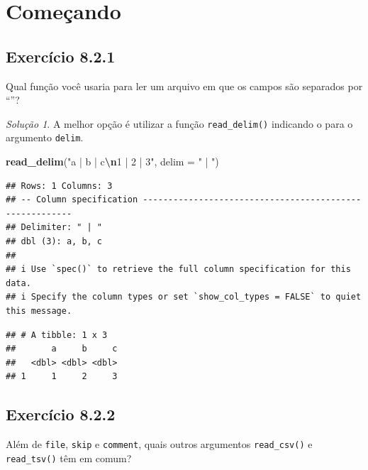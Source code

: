 \documentclass[
]{latex/krantz}
\newenvironment{Shaded}{\begin{snugshade}}{\end{snugshade}}
\newcommand{\AttributeTok}[1]{\textcolor[rgb]{0.13,0.29,0.53}{#1}}
\newcommand{\FunctionTok}[1]{\textcolor[rgb]{0.13,0.29,0.53}{\textbf{#1}}}
\newcommand{\NormalTok}[1]{#1}
\newcommand{\SpecialCharTok}[1]{\textcolor[rgb]{0.81,0.36,0.00}{\textbf{#1}}}
\newcommand{\StringTok}[1]{\textcolor[rgb]{0.31,0.60,0.02}{#1}}
\theoremstyle{definition}
\theoremstyle{definition}
\theoremstyle{definition}
\theoremstyle{definition}
\theoremstyle{remark}
\newtheorem*{solution}{Solução}
\begin{document}
\hypertarget{comeuxe7ando}{%
\section{Começando}\label{comeuxe7ando}}

\hypertarget{exr8-2-1}{%
\subsection*{Exercício 8.2.1}\label{exr8-2-1}}

Qual função você usaria para ler um arquivo em que os campos são separados por ``\textbar{}''?

\begin{solution}

A melhor opção é utilizar a função \texttt{read\_delim()} indicando o \texttt{\textbar{}} para o argumento \texttt{delim}.

\begin{Shaded}
\begin{Highlighting}[]
\FunctionTok{read\_delim}\NormalTok{(}\StringTok{"a | b | c}\SpecialCharTok{\textbackslash{}n}\StringTok{1 | 2 | 3"}\NormalTok{, }\AttributeTok{delim =} \StringTok{" | "}\NormalTok{)}
\end{Highlighting}
\end{Shaded}

\begin{verbatim}
## Rows: 1 Columns: 3
## -- Column specification --------------------------------------------------------
## Delimiter: " | "
## dbl (3): a, b, c
## 
## i Use `spec()` to retrieve the full column specification for this data.
## i Specify the column types or set `show_col_types = FALSE` to quiet this message.
\end{verbatim}

\begin{verbatim}
## # A tibble: 1 x 3
##       a     b     c
##   <dbl> <dbl> <dbl>
## 1     1     2     3
\end{verbatim}

\end{solution}

\hypertarget{exr8-2-2}{%
\subsection*{Exercício 8.2.2}\label{exr8-2-2}}

Além de \texttt{file}, \texttt{skip} e \texttt{comment}, quais outros argumentos \texttt{read\_csv()} e \texttt{read\_tsv()} têm em comum?
\end{document}
